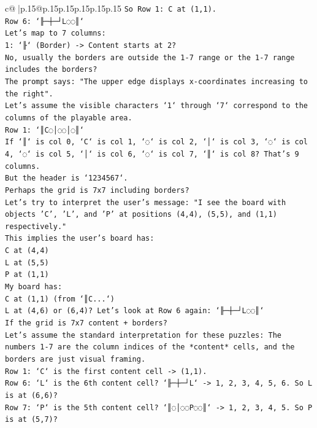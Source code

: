\documentclass{article}
\begin{document}
{\begin{supertabular}{c@{$\;$}|p{.15\linewidth}@{}p{.15\linewidth}p{.15\linewidth}p{.15\linewidth}p{.15\linewidth}p{.15\linewidth}}
{{{\texttt{So Row 1: C at (1,1).} \\
\texttt{Row 6: `╟─┼─┘L◌◌║`} \\
\texttt{Let's map to 7 columns:} \\
\texttt{1: `╟` (Border) {-}> Content starts at 2?} \\
\texttt{No, usually the borders are outside the 1{-}7 range or the 1{-}7 range includes the borders?} \\
\texttt{The prompt says: "The upper edge displays x{-}coordinates increasing to the right".} \\
\texttt{Let's assume the visible characters `1` through `7` correspond to the columns of the playable area.} \\
\texttt{Row 1: `║C◌│◌◌│◌║`} \\
\texttt{If `║` is col 0, `C` is col 1, `◌` is col 2, `│` is col 3, `◌` is col 4, `◌` is col 5, `│` is col 6, `◌` is col 7, `║` is col 8? That's 9 columns.} \\
\texttt{But the header is `1234567`.} \\
\texttt{Perhaps the grid is 7x7 including borders?} \\
\texttt{Let's try to interpret the user's message: "I see the board with objects 'C', 'L', and 'P' at positions (4,4), (5,5), and (1,1) respectively."} \\
\texttt{This implies the user's board has:} \\
\texttt{C at (4,4)} \\
\texttt{L at (5,5)} \\
\texttt{P at (1,1)} \\
\texttt{My board has:} \\
\texttt{C at (1,1) (from `║C...`)} \\
\texttt{L at (4,6) or (6,4)? Let's look at Row 6 again: `╟─┼─┘L◌◌║`} \\
\texttt{If the grid is 7x7 content + borders?} \\
\texttt{Let's assume the standard interpretation for these puzzles: The numbers 1{-}7 are the column indices of the *content* cells, and the borders are just visual framing.} \\
\texttt{Row 1: `C` is the first content cell {-}> (1,1).} \\
\texttt{Row 6: `L` is the 6th content cell? `╟─┼─┘L` {-}> 1, 2, 3, 4, 5, 6. So L is at (6,6)?} \\
\texttt{Row 7: `P` is the 5th content cell? `║◌│◌◌P◌◌║` {-}> 1, 2, 3, 4, 5. So P is at (5,7)?} \\
}}}
\end{supertabular}}
\end{document}
